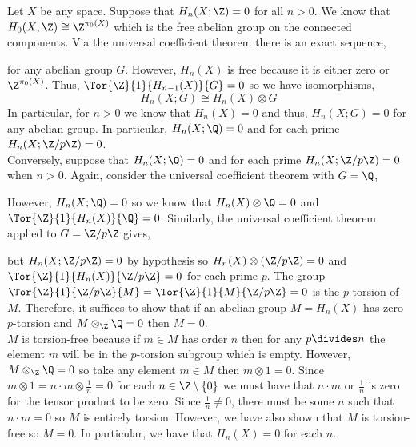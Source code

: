 \documentclass[12pt]{extarticle}
\begin{document}
Let $X$ be any space. Suppose that $H_n(X; \Z) = 0$ for all $n > 0$. We know that $H_0(X; \Z) \cong \Z^{\pi_0(X)}$ which is the free abelian group on the connected components. Via the universal coefficient theorem there is an exact sequence,
\begin{center}
\end{center} 
for any abelian group $G$. However, $H_n(X)$ is free because it is either zero or $\Z^{\pi_0(X)}$. Thus, $\Tor{\Z}{1}{H_{n-1}(X)}{G} = 0$ so we have isomorphisms,
\[ H_n(X ; G) \cong H_n(X) \otimes G\]
In particular, for $n > 0$ we know that $H_n(X) = 0$ and thus, $H_n(X ; G) = 0$ for any abelian group. In particular, $H_n(X; \Q) = 0$ and for each prime $H_n(X ; \Z / p \Z) = 0$. 
\bigskip\\
Conversely, 
suppose that $H_n(X ; \Q) = 0$ and for each prime $H_n(X ; \Z / p \Z) = 0$ when $n > 0$. Again, consider the universal coefficient theorem with $G = \Q$,
\begin{center}
\end{center} 
However, $H_n(X ; \Q) = 0$ so we know that $H_n(X) \otimes \Q = 0$ and $\Tor{\Z}{1}{H_n(X)}{\Q} = 0$. Similarly, the universal coefficient theorem applied to $G = \Z / p \Z$ gives, 
\begin{center}
\end{center} 
but $H_n(X ; \Z / p \Z) = 0$ by hypothesis so $H_n(X) \otimes (\Z / p \Z) = 0$ and $\Tor{\Z}{1}{H_n(X)}{\Z / p \Z} = 0$ for each prime $p$. The group  $\Tor{\Z}{1}{\Z / p \Z}{M} = \Tor{\Z}{1}{M}{\Z / p \Z} = 0$ is the $p$-torsion of $M$. Therefore, it suffices to show that if an abelian group $M = H_n(X)$ has zero $p$-torsion and $M \otimes_{\Z} \Q = 0$ then $M = 0$. 
\bigskip\\ 
$M$ is torsion-free because if $m \in M$ has order $n$ then for any $p \divides n$ the element $m$ will be in the $p$-torsion subgroup which is empty. However, $M \otimes_{\Z} \Q = 0$ so take any element $m \in M$ then $m \otimes 1 = 0$. Since $m \otimes 1 = n \cdot m \otimes \frac{1}{n} = 0$ for each $n \in \Z \setminus \{0\}$ we must have that $n \cdot m$ or $\frac{1}{n}$ is zero for the tensor product to be zero. Since $\frac{1}{n} \neq 0$, there must be some $n$ such that $n \cdot m = 0$ so $M$ is entirely torsion. However, we have also shown that $M$ is torsion-free so $M = 0$. In particular, we have that $H_n(X) = 0$ for each $n$. 
\end{document}
